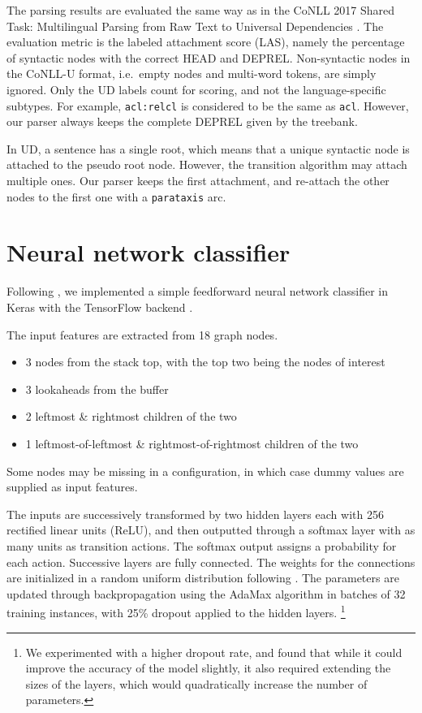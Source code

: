 \documentclass[11pt]{article}
\begin{document}
The parsing results are evaluated the same way as in the CoNLL 2017 Shared Task: Multilingual Parsing from Raw Text to Universal Dependencies \parencite{udst:overview}.
The evaluation metric is the labeled attachment score (LAS),
namely the percentage of syntactic nodes with the correct HEAD and DEPREL\@.
Non-syntactic nodes in the CoNLL-U format, i.e.\ empty nodes and multi-word tokens, are simply ignored.
Only the UD labels count for scoring, and not the language-specific subtypes.
For example, \texttt{acl:relcl} is considered to be the same as \texttt{acl}.
However, our parser always keeps the complete DEPREL given by the treebank.

In UD, a sentence has a single root,
which means that a unique syntactic node is attached to the pseudo root node.
However, the transition algorithm may attach multiple ones.
Our parser keeps the first attachment, and re-attach the other nodes to the first one with a \texttt{parataxis} arc.

\section{Neural network classifier}
\label{sec:nnc}

Following \textcite{chen2014fast}, we implemented a simple feedforward neural network classifier
in Keras \parencite{chollet2015keras} with the TensorFlow backend \parencite{tensorflow2015-whitepaper}.

The input features are extracted from 18 graph nodes.

\begin{itemize}
\item 3 nodes from the stack top, with the top two being the nodes of interest
\item 3 lookaheads from the buffer
\item 2 leftmost \& rightmost children of the two
\item 1 leftmost-of-leftmost \& rightmost-of-rightmost children of the two
\end{itemize}

Some nodes may be missing in a configuration,
in which case dummy values are supplied as input features.

The inputs are successively transformed by two hidden layers each with 256 rectified linear units (ReLU),
and then outputted through a softmax layer with as many units as transition actions.
The softmax output assigns a probability for each action.
Successive layers are fully connected.
The weights for the connections are initialized in a random uniform distribution following \textcite{he2015delving}.
The parameters are updated through backpropagation using the AdaMax algorithm \parencite{kingma2014adam} in batches of 32 training instances,
with 25\% dropout \parencite{srivastava2014dropout} applied to the hidden layers.%
\footnote{We experimented with a higher dropout rate,
  and found that while it could improve the accuracy of the model slightly,
  it also required extending the sizes of the layers,
  which would quadratically increase the number of parameters.}
\end{document}
